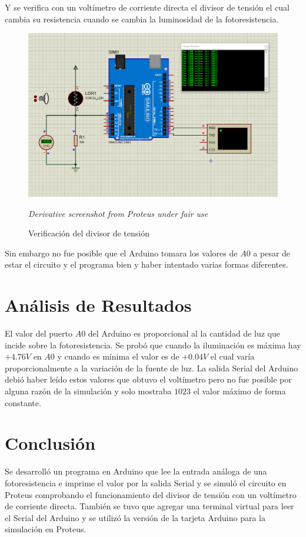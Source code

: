 \documentclass{article}
\begin{document}
Y se verifica con un voltímetro de corriente directa el divisor de tensión el cual cambia su resistencia cuando se cambia la luminosidad de la fotoresistencia.

\begin{figure}[H]
\centering
\includegraphics[width=0.3\paperwidth]{images/sim-2.png}
\caption{Verificación del divisor de tensión}\footnotesize
\textit{Derivative screenshot from Proteus under fair use}
\end{figure}

Sin embargo no fue posible que el Arduino tomara los valores de $A0$ a pesar de estar el circuito y el programa bien y haber intentado varias formas diferentes.

\section{Análisis de Resultados}

El valor del puerto $A0$ del Arduino es proporcional al la cantidad de luz que incide sobre la fotoresistencia. Se probó que cuando la iluminación es máxima hay $+4.76V$ en $A0$ y cuando es mínima el valor es de $+0.04V$ el cual varía proporcionalmente a la variación de la fuente de luz. La salida Serial del Arduino debió haber leído estos valores que obtuvo el voltímetro pero no fue posible por alguna razón de la simulación y solo mostraba $1023$ el valor máximo de forma constante.

\section{Conclusión}

Se desarrolló un programa en Arduino que lee la entrada análoga de una fotoresistencia e imprime el valor por la salida Serial y se simuló el circuito en Proteus comprobando el funcionamiento del divisor de tensión con un voltímetro de corriente directa. También se tuvo que agregar una terminal virtual para leer el Serial del Arduino y se utilizó la versión  de la tarjeta Arduino para la simulación en Proteus.

\printbibliography
\end{document}
